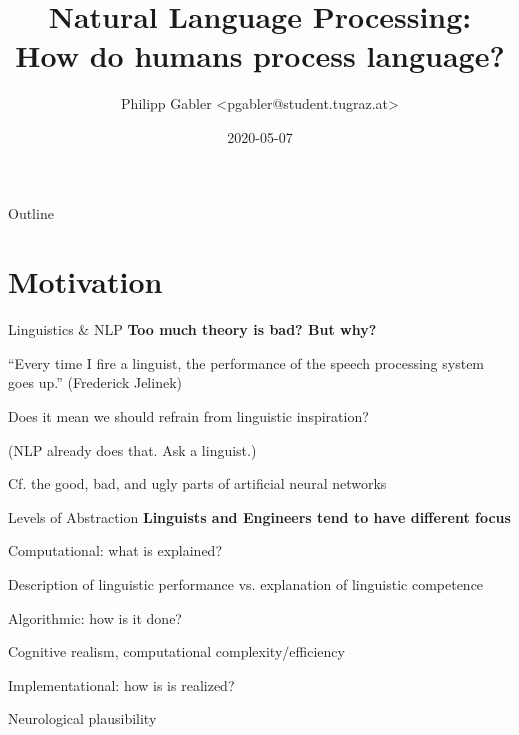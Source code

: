 \documentclass[aspectratio=169,cramped]{beamer}
\title{Natural Language Processing: \\ How do humans process language?}
\author{Philipp Gabler <pgabler@student.tugraz.at>}
\date{2020-05-07}
\let\tempone\itemize
\let\temptwo\enditemize
\renewenvironment{itemize}{\tempone\addtolength{\itemsep}{-0\baselineskip}\addtolength{\parskip}{-0.2\baselineskip}}{\temptwo}
\newcommand{\ex}[1]{{\color{teal} #1}}
\begin{document}
\begin{frame}
    \titlepage
\end{frame}

\begin{frame}{Outline}
    \tableofcontents
\end{frame}


\section{Motivation}

\begin{frame}{Linguistics \& NLP}
  \textbf{Too much theory is bad? But why?}
	\begin{itemize}
  \item ``Every time I fire a linguist, the performance of the speech processing system goes up.''
    (Frederick Jelinek)
  \item Does it mean we should refrain from linguistic inspiration?
    \begin{itemize}
    \item (NLP already does that.  Ask a linguist.)
    \end{itemize}
  \item Cf. the good, bad, and ugly parts of artificial neural networks
	\end{itemize}
\end{frame}

\begin{frame}{Levels of Abstraction}
	\textbf{Linguists and Engineers tend to have different focus}
	\begin{itemize}
  \item Computational: what is explained?
    \begin{itemize}
    \item \ex{Description of linguistic performance vs. explanation of linguistic competence}
    \end{itemize}
  \item Algorithmic: how is it done?
    \begin{itemize}
    \item  \ex{Cognitive realism, computational complexity/efficiency}
    \end{itemize}
  \item Implementational: how is is realized?
    \begin{itemize}
    \item  \ex{Neurological plausibility}
    \end{itemize}
  \end{itemize}
\end{frame}
\end{document}
